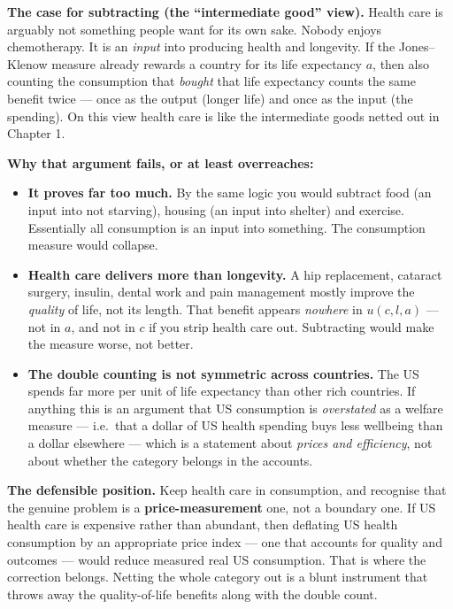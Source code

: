 \documentclass[12pt, letterpaper]{article}
\begin{document}
\begin{tcolorbox}[oddbox,title={Problem 2.3 \quad Healthcare}]
\begin{enumerate}
\textbf{The case for subtracting (the ``intermediate good'' view).} Health care is arguably
not something people want for its own sake. Nobody enjoys chemotherapy. It is an
\emph{input} into producing health and longevity. If the Jones--Klenow measure already
rewards a country for its life expectancy $a$, then also counting the consumption that
\emph{bought} that life expectancy counts the same benefit twice --- once as the output
(longer life) and once as the input (the spending). On this view health care is like the
intermediate goods netted out in Chapter 1.

\textbf{Why that argument fails, or at least overreaches:}

\begin{itemize}[leftmargin=1.3em,itemsep=3pt,topsep=2pt]
\item \textbf{It proves far too much.} By the same logic you would subtract food (an input
into not starving), housing (an input into shelter) and exercise. Essentially all
consumption is an input into something. The consumption measure would collapse.
\item \textbf{Health care delivers more than longevity.} A hip replacement, cataract surgery,
insulin, dental work and pain management mostly improve the \emph{quality} of life,
not its length. That benefit appears \emph{nowhere} in $u(c,l,a)$ --- not in $a$, and
not in $c$ if you strip health care out. Subtracting would make the measure worse, not
better.
\item \textbf{The double counting is not symmetric across countries.} The US spends far more
per unit of life expectancy than other rich countries. If anything this is an argument
that US consumption is \emph{overstated} as a welfare measure --- i.e.\ that a dollar
of US health spending buys less wellbeing than a dollar elsewhere --- which is a
statement about \emph{prices and efficiency}, not about whether the category belongs
in the accounts.
\end{itemize}

\textbf{The defensible position.} Keep health care in consumption, and recognise that the
genuine problem is a \textbf{price-measurement} one, not a boundary one. If US health care is
expensive rather than abundant, then deflating US health consumption by an appropriate price
index --- one that accounts for quality and outcomes --- would reduce measured real US
consumption. That is where the correction belongs. Netting the whole category out is a blunt
instrument that throws away the quality-of-life benefits along with the double count.

\end{enumerate}
\end{tcolorbox}
\end{document}
